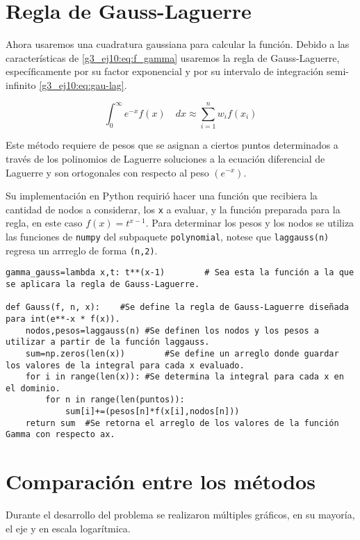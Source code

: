 \documentclass[../portafolio.tex]{subfiles}
\begin{document}
\section{Regla de Gauss-Laguerre}
Ahora usaremos una cuadratura gaussiana \citep{Gamma0} para calcular la función. Debido a las características de \eqref{g3_ej10:eq:f_gamma} usaremos la regla de Gauss-Laguerre, específicamente por su factor exponencial y por su intervalo de integración semi-infinito \eqref{g3_ej10:eq:gau-lag}.

\begin{equation}\label{g3_ej10:eq:gau-lag}
\int_0^\infty e^{-x} f(x) \quad dx \approx \sum_{i=1}^n w_i f(x_i)
\end{equation}

Este método requiere de pesos que se asignan a ciertos puntos determinados a través de los polinomios de Laguerre soluciones a la ecuación diferencial de Laguerre y son ortogonales con respecto al peso $( e^{-x} )$.

Su implementación en Python requirió hacer una función que recibiera la cantidad de nodos a considerar, los \texttt{x} a evaluar, y la función preparada para la regla, en este caso $f(x)=t^{x-1}$. Para determinar los pesos y los nodos  se utiliza las funciones de \texttt{numpy} del subpaquete \texttt{polynomial}, notese que \texttt{laggauss(n)} \citep{numpy_laggauss} regresa un arrreglo de forma \texttt{(n,2)}.

\begin{verbatim}
gamma_gauss=lambda x,t: t**(x-1)		# Sea esta la función a la que se aplicara la regla de Gauss-Laguerre.

def Gauss(f, n, x):    #Se define la regla de Gauss-Laguerre diseñada para int(e**-x * f(x)).
    nodos,pesos=laggauss(n)	#Se definen los nodos y los pesos a utilizar a partir de la función laggauss.
    sum=np.zeros(len(x))		#Se define un arreglo donde guardar los valores de la integral para cada x evaluado.
    for i in range(len(x)):	#Se determina la integral para cada x en el dominio.
        for n in range(len(puntos)):
            sum[i]+=(pesos[n]*f(x[i],nodos[n]))
    return sum	#Se retorna el arreglo de los valores de la función Gamma con respecto ax.
\end{verbatim}

\section{Comparación entre los métodos}
Durante el desarrollo del problema se realizaron múltiples gráficos, en su mayoría, el eje y en escala logarítmica.
\end{document}
